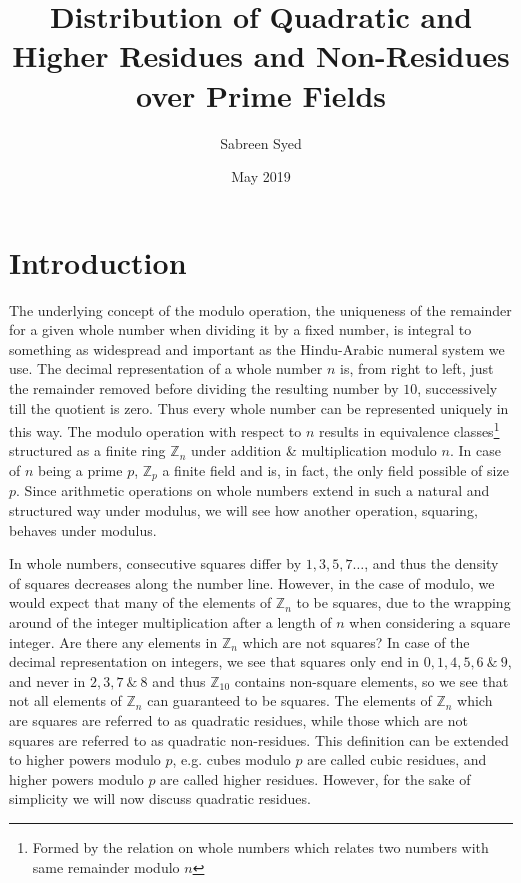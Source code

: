 \documentclass{report}
\title{Distribution of Quadratic and Higher Residues and Non-Residues over Prime Fields}
\author{
  Sabreen Syed\\
  \multicolumn{1}{p{.7\textwidth}}{\centering\emph{Department of Computer Science and Engineering\\
  Indian Institute of Technology Kanpur, India}}}
\date{May 2019}
\begin{document}

\maketitle

\tableofcontents
\newpage

\chapter{Introduction}
%
The underlying concept of the modulo operation, the uniqueness of the remainder for a given whole number when dividing it by a fixed number, is integral to something as widespread and important as the Hindu-Arabic numeral system we use. The decimal representation of a whole number $n$ is, from right to left, just the remainder removed before dividing the resulting number by $10$, successively till the quotient is zero. Thus every whole number can be represented uniquely in this way. The modulo operation with respect to $n$ results in equivalence classes\footnote[2] {Formed by the relation on whole numbers which relates two numbers with same remainder modulo $n$} structured as a finite ring $\mathbb{Z}_n$ under addition \& multiplication modulo $n$.  In case of $n$ being a prime $p$, $\mathbb{Z}_p$ a finite field and is, in fact, the only field possible of size $p$. Since arithmetic operations on whole numbers extend in such a natural and structured way under modulus, we will see how another operation, squaring, behaves under modulus.

In whole numbers, consecutive squares differ by $1,3,5,7 \ldots$, and thus the density of squares decreases along the number line. However, in the case of modulo, we would expect that many of the elements of $\mathbb{Z}_n$ to be squares, due to the wrapping around of the integer multiplication after a length of $n$ when considering a square integer. Are there any elements in $\mathbb{Z}_n$ which are not squares? In case of the decimal representation on integers, we see that squares only end in $0,1,4,5,6\  \& \ 9$, and never in $2,3,7 \  \& \  8$ and thus $\mathbb {Z}_{10}$ contains non-square elements, so we see that not all elements of $\mathbb{Z}_n$ can guaranteed to be squares. The elements of $\mathbb{Z}_n$ which are squares are referred to as quadratic residues, while those which are not squares are referred to as quadratic non-residues. This definition can be extended to higher powers modulo $p$, e.g. cubes modulo $p$ are called cubic residues, and higher powers modulo $p$ are called higher residues. However, for the sake of simplicity we will now discuss quadratic residues.
\end{document}
